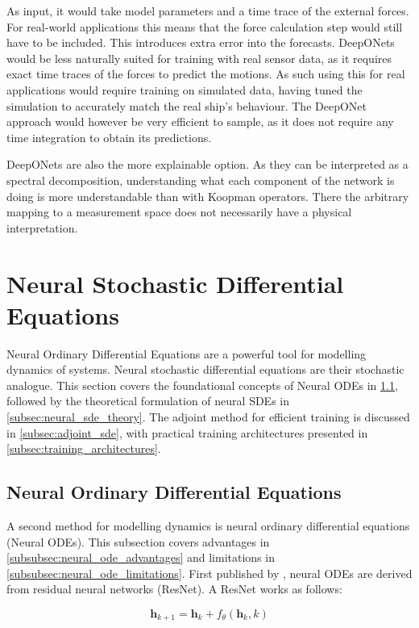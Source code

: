As input, it would take model parameters and a time trace of the
external forces. For real-world applications this means that the force calculation step would still have to be included.
This introduces extra error into the forecasts. DeepONets would be less naturally suited for training with real sensor
data, as it requires exact time traces of the forces to predict the motions. As such using this for real applications
would require training on simulated data, having tuned the simulation to accurately match the real ship's behaviour. The
DeepONet approach would however be very efficient to sample, as it does not require any time integration to obtain its
predictions.

DeepONets are also the more explainable option. As they can be interpreted as a spectral decomposition, understanding
what each component of the network is doing is more understandable than with Koopman operators. There the arbitrary
mapping to a measurement space does not necessarily have a physical interpretation.

\section{Neural Stochastic Differential Equations}
\label{sec:neural_sde}
Neural Ordinary Differential Equations are a powerful tool for modelling dynamics of systems. Neural stochastic differential equations are their stochastic analogue. This section covers the foundational concepts of Neural ODEs in \cref{subsec:neural_ode}, followed by the theoretical formulation of neural SDEs in \cref{subsec:neural_sde_theory}. The adjoint method for efficient training is discussed in \cref{subsec:adjoint_sde}, with practical training architectures presented in \cref{subsec:training_architectures}. 

\subsection{Neural Ordinary Differential Equations}
\label{subsec:neural_ode}
A second method for modelling dynamics is neural ordinary differential equations (Neural ODEs). This subsection covers advantages in \cref{subsubsec:neural_ode_advantages} and limitations in \cref{subsubsec:neural_ode_limitations}. First published by
\textcite{chenNeuralOrdinaryDifferential2018}, neural ODEs are derived from residual neural networks (ResNet). A ResNet
works as follows:

\begin{equation}
    \mathbf{h}_{k + 1} = \mathbf{h}_k + f_\theta\left(\mathbf{h}_k, k\right)
    \label{eq:resnet}
\end{equation}

